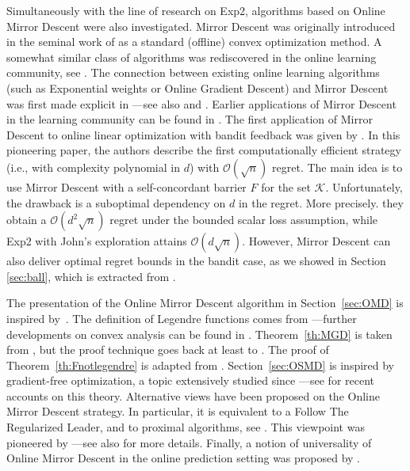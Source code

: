 \documentclass[11pt]{hackednow}
\newcommand{\cK}{\mathcal{K}}
\begin{document}
Simultaneously with the line of research on Exp2, algorithms based on Online Mirror Descent were also investigated. Mirror Descent was originally introduced in the seminal work of \cite{Nem79, NY83} as a standard (offline) convex optimization method. A somewhat similar class of algorithms was rediscovered in the online learning community, see \cite{HW98, GLS01, KW01, Sha07}. The connection between existing online learning algorithms (such as Exponential weights or Online Gradient Descent) and Mirror Descent was first made explicit in \cite{CL06} ---see also \cite{Rak09} and \cite{Haz11}. Earlier applications of Mirror Descent in the learning community can be found in \cite{JNTV05}. The first application of Mirror Descent to online linear optimization with bandit feedback was given by \cite{AHR08}. In this pioneering paper, the authors describe the first computationally efficient strategy (i.e., with complexity polynomial in $d$) with $\mathcal{O}(\sqrt{n})$ regret. The main idea is to use Mirror Descent with a self-concordant barrier $F$ for the set $\cK$. Unfortunately, the drawback is a suboptimal dependency on $d$ in the regret. More precisely. they obtain a $\mathcal{O}(d^2 \sqrt{n})$ regret under the bounded scalar loss assumption, while Exp2 with John's exploration attains $\mathcal{O}(d \sqrt{n})$. However, Mirror Descent can also deliver optimal regret bounds in the bandit case, as we showed in Section \ref{sec:ball}, which is extracted from \cite{BCK12}.

The presentation of the Online Mirror Descent algorithm in Section~\ref{sec:OMD} is inspired by~\cite{Bub11}. The definition of Legendre functions comes from \cite[Chapter 11]{CL06} ---further developments on convex analysis can be found in \cite{HL01, BV04}. Theorem~\ref{th:MGD} is taken from \cite{ABL11}, but the proof technique goes back at least to \cite{BN99}. The proof of Theorem~\ref{th:Fnotlegendre} is adapted from \cite{KST10}. Section~\ref{sec:OSMD} is inspired by gradient-free optimization, a topic extensively studied since \cite{RM51, KW52} ---see \cite{NJLS09, CSV09, Nes11, BM11} for recent accounts on this theory.
Alternative views have been proposed on the Online Mirror Descent strategy. In particular, it is equivalent to a Follow The Regularized Leader, and to proximal algorithms, see \cite{Rak09}. This viewpoint was pioneered by \cite{BT03} ---see also \cite{BPSS11} for more details. Finally, a notion of universality of Online Mirror Descent in the online prediction setting was proposed by \cite{SST11}.
\end{document}
